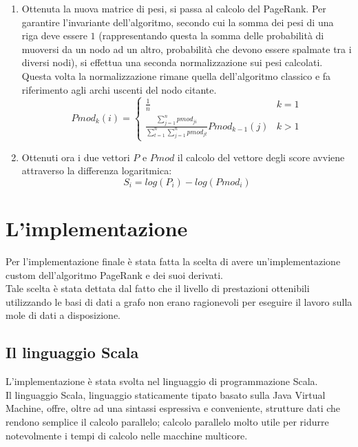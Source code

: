 \documentclass[a4paper, 12pt]{article}
\let\oldsection\section
\renewcommand\section{\clearpage\oldsection}
\newcommand{\pagerankModificato}{Pmod}
\newcommand{\pesiPagerankModificato}{pmod}
\begin{document}
\begin{enumerate}
  \item 
  Ottenuta la nuova matrice di pesi, si passa al calcolo del PageRank. Per garantire l'invariante dell'algoritmo, secondo cui la somma dei pesi di una riga deve essere $1$ (rappresentando questa la somma delle probabilità di muoversi da un nodo ad un altro, probabilità che devono essere spalmate tra i diversi nodi), si effettua una seconda normalizzazione sui pesi calcolati. Questa volta la normalizzazione rimane quella dell'algoritmo classico e fa riferimento agli archi uscenti del nodo citante.
  \[  
    \pagerankModificato_k(i) = 
    \begin{cases} 
      \displaystyle \frac{1}{n} & k = 1 \\
      \displaystyle \frac
        {\displaystyle \sum_{j=1}^{n} \pesiPagerankModificato_{ji}}
        {\displaystyle \sum_{t=1}^{n} {\sum_{j=1}^{n} \pesiPagerankModificato_{jt}}}
        \pagerankModificato_{k-1}(j) & k > 1 

    \end{cases} 
  \]
  
  \item
  Ottenuti ora i due vettori $P$ e $\pagerankModificato$ il calcolo del vettore degli score avviene attraverso la differenza logaritmica:
  \[
    S_i = log(P_i) - log(\pagerankModificato_i) 
  \]

\end{enumerate}

\section{L'implementazione}
Per l'implementazione finale è stata fatta la scelta di avere un'implementazione custom dell'algoritmo PageRank e dei suoi derivati. \\
Tale scelta è stata dettata dal fatto che il livello di prestazioni ottenibili utilizzando le basi di dati a grafo non erano ragionevoli per eseguire il lavoro sulla mole di dati a disposizione.
\subsection{Il linguaggio Scala}
L'implementazione è stata svolta nel linguaggio di programmazione Scala. \\
Il linguaggio Scala, linguaggio staticamente tipato basato sulla Java Virtual Machine, offre, oltre ad una sintassi espressiva e conveniente, strutture dati che rendono semplice il calcolo parallelo; calcolo parallelo molto utile per ridurre notevolmente i tempi di calcolo nelle macchine multicore.
\end{document}
